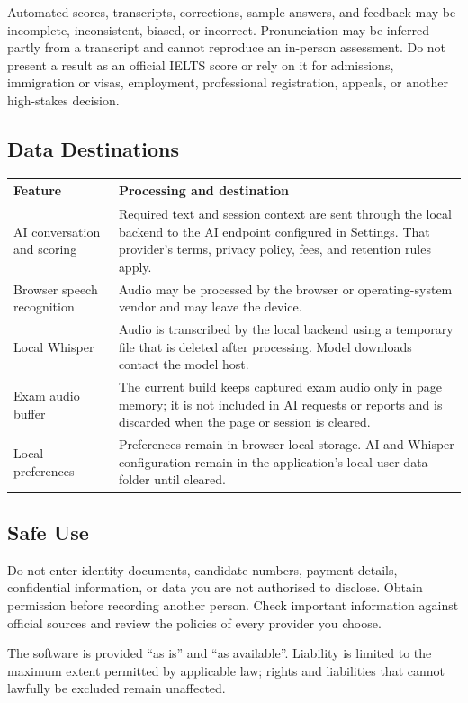 \documentclass[12pt,a4paper]{article}
\begin{document}
Automated scores, transcripts, corrections, sample answers, and feedback may be incomplete, inconsistent, biased, or incorrect. Pronunciation may be inferred partly from a transcript and cannot reproduce an in-person assessment. Do not present a result as an official IELTS score or rely on it for admissions, immigration or visas, employment, professional registration, appeals, or another high-stakes decision.

\subsection{Data Destinations}

\begin{tabularx}{\textwidth}{lX}
  \hline
  Feature & Processing and destination \\
  \hline
  AI conversation and scoring & Required text and session context are sent through the local backend to the AI endpoint configured in Settings. That provider's terms, privacy policy, fees, and retention rules apply. \\
  Browser speech recognition & Audio may be processed by the browser or operating-system vendor and may leave the device. \\
  Local Whisper & Audio is transcribed by the local backend using a temporary file that is deleted after processing. Model downloads contact the model host. \\
  Exam audio buffer & The current build keeps captured exam audio only in page memory; it is not included in AI requests or reports and is discarded when the page or session is cleared. \\
  Local preferences & Preferences remain in browser local storage. AI and Whisper configuration remain in the application's local user-data folder until cleared. \\
  \hline
\end{tabularx}

\subsection{Safe Use}

Do not enter identity documents, candidate numbers, payment details, confidential information, or data you are not authorised to disclose. Obtain permission before recording another person. Check important information against official sources and review the policies of every provider you choose.

The software is provided ``as is'' and ``as available''. Liability is limited to the maximum extent permitted by applicable law; rights and liabilities that cannot lawfully be excluded remain unaffected.
\end{document}

